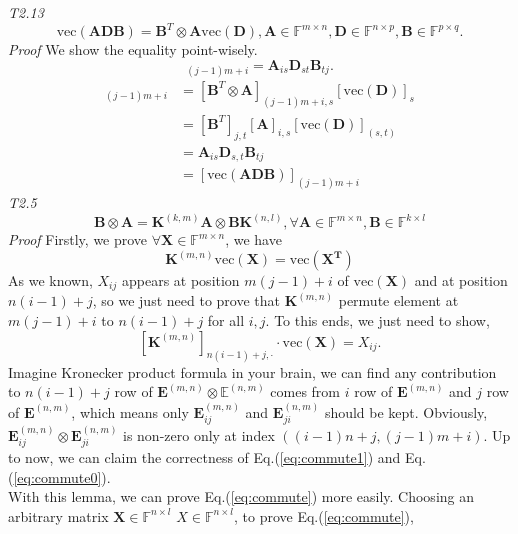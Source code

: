 \documentclass[a4paper,11pt]{article}
\def\E{\mathbb{E}}
\def\m#1{\mathbf{#1}}
\def\v#1{\mathrm{vec}({\mathbf{#1}})}
\begin{document}
\emph{T2.13}
\begin{equation}
\label{eq:vec_k}
    \v {ADB} = \m B^T \otimes \m A \v D, \m A \in \mathbb{F}^{m\times n}, \m D \in \mathbb{F}^{n\times p}, \m B \in \mathbb{F}^{p \times q}.
\end{equation}
\emph{Proof}
We show the equality point-wisely.
\begin{equation}
    [\v {ADB}]_{(j-1)m+i} = \m A_{is}\m D_{st} \m B_{tj}.
\end{equation}
\begin{align}
    [\m B^T \otimes \m A \v D]_{(j-1)m+i} & = [\m B^T \otimes \m A]_{(j-1)m+i, s}[\v D]_{s} \\ & = [\m B^T]_{j,t} [\m A]_{i, s} [\v D]_{(s,t)} \\ & = \m A_{is} \m D_{s,t} \m B_{tj} \\ & = [\v {ADB}]_{(j-1)m+i}
\end{align}
\emph{T2.5}
\begin{equation}
\label{eq:commute}
    \m B \otimes \m A = \m K^{(k,m)} \m A \otimes \m B \m K^{(n,l)},\forall \m A \in \mathbb{F}^{m\times n}, \m B \in \mathbb{F}^{k\times l}
\end{equation}
\emph{Proof}
Firstly, we prove $\forall \m X \in \mathbb{F}^{m\times n}$, we have
\begin{equation}
\label{eq:commute0}
\m K^{(m,n)} \v X = \v {X^T}
\end{equation}
As we known, $X_{ij}$ appears at position $m(j-1)+i$ of $\v X$ and at position $n(i-1)+j$, so we just need to prove that $\m K^{(m,n)}$ permute element at $m(j-1)+i$ to $n(i-1)+j$ for all $i,j$. To this ends, we just need to show,
\begin{equation}
\label{eq:commute1}
    [\m K^{(m,n)}]_{n(i-1)+j, \cdot} \cdot \v X = X_{ij}.
\end{equation}
Imagine Kronecker product formula in your brain, we can find any contribution to $n(i-1)+j$ row of $\m E^{(m,n)} \otimes \m \E^{(n,m)}$ comes from $i$ row of $\m E^{(m,n)}$ and $j$ row of $\m E^{(n,m)}$, which means only $\m E^{(m,n)}_{ij}$ and $\m E^{(n,m)}_{ji}$ should be kept. Obviously, $\m E^{(m,n)}_{ij} \otimes \m E^{(n,m)}_{ji}$ is non-zero only at index $((i-1)n+j, (j-1)m+i)$. Up to now, we can claim the correctness of Eq.(\ref{eq:commute1}) and Eq.(\ref{eq:commute0}).\\ 
With this lemma, we can prove Eq.(\ref{eq:commute}) more easily. Choosing an arbitrary matrix $\m X \in \mathbb{F}^{n\times l}$
 $X \in \mathbb{F}^{n\times l}$, to prove Eq.(\ref{eq:commute}),
\end{document}
